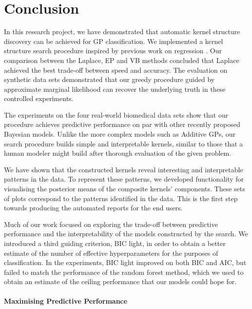 \documentclass[a4paper,12pt ]{report}
\begin{document}
\cleardoublepage


\chapter{Conclusion}

In this research project, we have demonstrated that automatic kernel structure discovery can be achieved for GP classification. We implemented a kernel structure search procedure inspired by previous work on regression \cite{duvenaud13}. Our comparison between the Laplace, EP and VB methods concluded that Laplace achieved the best trade-off between speed and accuracy. The evaluation on synthetic data sets demonstrated that our greedy procedure guided by approximate marginal likelihood can recover the underlying truth in these controlled experiments.

The experiments on the four real-world biomedical data sets show that our procedure achieves predictive performance on par with other recently proposed Bayesian models. Unlike the more complex models such as Additive GPs, our search procedure builds simple and interpretable kernels, similar to those that a human modeler might build after thorough evaluation of the given problem.

We have shown that the constructed kernels reveal interesting and interpretable patterns in the data. To represent these patterns, we developed functionality for visualising the posterior means of the composite kernels' components. These sets of plots correspond to the patterns identified in the data. This is the first step towards producing the automated reports for the end users.

Much of our work focused on exploring the trade-off between predictive performance and the interpretability of the models constructed by the search. We introduced a third guiding criterion, BIC light, in order to obtain a better estimate of the number of effective hyperparameters for the purposes of classification. In the experiments, BIC light improved on both BIC and AIC, but failed to match the performance of the random forest method, which we used to obtain an estimate of the ceiling performance that our models could hope for.

\subsubsection*{Maximising Predictive Performance}
 
\end{document}
